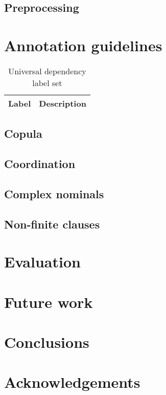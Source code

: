 \documentclass[a4paper,11pt, onecolumn]{article}
\begin{document}
\subsection{Preprocessing}

\cite{Washington14}



\section{Annotation guidelines}



\begin{table}
  \centering
  \begin{tabular}{|l|l|}
    \hline
    \textbf{Label} & \textbf{Description} \\

    \hline
  \end{tabular}
  \caption{Universal dependency label set}
\end{table}

\subsection{Copula}

\subsection{Coordination}

\subsection{Complex nominals}


\subsection{Non-finite clauses}

\section{Evaluation}

\section{Future work}



\section{Conclusions}

\section*{Acknowledgements}



\end{document}
